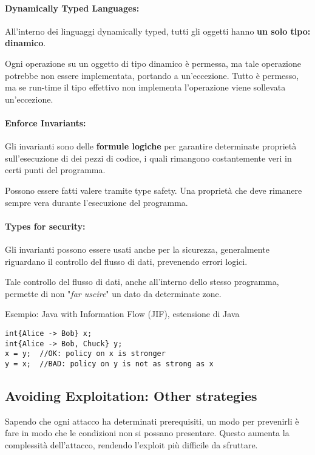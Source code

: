 \paragraph{Dynamically Typed Languages:} All'interno dei linguaggi dynamically typed, tutti gli oggetti hanno \textbf{un solo tipo: dinamico}. 

Ogni operazione su un oggetto di tipo dinamico è permessa, ma tale operazione potrebbe non essere implementata, portando a un'eccezione. Tutto è permesso, ma se run-time il tipo effettivo non implementa l'operazione viene sollevata un'eccezione.

\paragraph{Enforce Invariants:} Gli invarianti sono delle \textbf{formule logiche} per garantire determinate proprietà sull'esecuzione di dei pezzi di codice, i quali rimangono costantemente veri in certi punti del programma. 

Possono essere fatti valere tramite type safety. Una proprietà che deve rimanere sempre vera durante l'esecuzione del programma.

\paragraph{Types for security:} Gli invarianti possono essere usati anche per la sicurezza, generalmente riguardano il controllo del flusso di dati, prevenendo errori logici.

Tale controllo del flusso di dati, anche all'interno dello stesso programma, permette di non "\textit{far uscire}" un dato da determinate zone.

Esempio: Java with Information Flow (JIF), estensione di Java
\begin{verbatim}
int{Alice -> Bob} x;
int{Alice -> Bob, Chuck} y;
x = y;  //OK: policy on x is stronger
y = x;  //BAD: policy on y is not as strong as x
\end{verbatim}

\subsection{Avoiding Exploitation: Other strategies}

Sapendo che ogni attacco ha determinati prerequisiti, un modo per prevenirli è fare in modo che le condizioni non si possano presentare. Questo aumenta la complessità dell'attacco, rendendo l'exploit più difficile da sfruttare.

